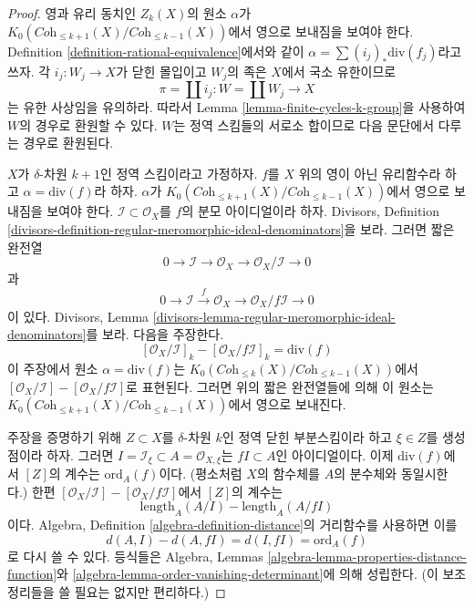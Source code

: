 \begin{proof}
영과 유리 동치인 $Z_k(X)$의 원소 $\alpha$가
$K_0(\textit{Coh}_{\leq k + 1}(X)/\textit{Coh}_{\leq k - 1}(X))$에서
영으로 보내짐을 보여야 한다. Definition
\ref{definition-rational-equivalence}에서와 같이
$\alpha = \sum (i_j)_*\text{div}(f_j)$라고 쓰자. 각
$i_j : W_j \to X$가 닫힌 몰입이고 $W_j$의 족은 $X$에서 국소 유한이므로
$$
\pi = \coprod i_j : W = \coprod W_j \longrightarrow X
$$
는 유한 사상임을 유의하라. 따라서 Lemma
\ref{lemma-finite-cycles-k-group}을 사용하여 $W$의 경우로 환원할 수 있다.
$W$는 정역 스킴들의 서로소 합이므로 다음 문단에서 다루는 경우로
환원된다.

\medskip\noindent
$X$가 $\delta$-차원 $k + 1$인 정역 스킴이라고 가정하자. $f$를 $X$ 위의
영이 아닌 유리함수라 하고 $\alpha = \text{div}(f)$라 하자.
$\alpha$가
$K_0(\textit{Coh}_{\leq k + 1}(X)/\textit{Coh}_{\leq k - 1}(X))$에서
영으로 보내짐을 보여야 한다. $\mathcal{I} \subset \mathcal{O}_X$를
$f$의 분모 아이디얼이라 하자. Divisors, Definition
\ref{divisors-definition-regular-meromorphic-ideal-denominators}을 보라.
그러면 짧은 완전열
$$
0 \to \mathcal{I} \to \mathcal{O}_X \to \mathcal{O}_X/\mathcal{I} \to 0
$$
과
$$
0 \to \mathcal{I} \xrightarrow{f} \mathcal{O}_X \to
\mathcal{O}_X/f\mathcal{I} \to 0
$$
이 있다. Divisors, Lemma
\ref{divisors-lemma-regular-meromorphic-ideal-denominators}를 보라.
다음을 주장한다.
$$
[\mathcal{O}_X/\mathcal{I}]_k - [\mathcal{O}_X/f\mathcal{I}]_k =
\text{div}(f)
$$
이 주장에서 원소 $\alpha = \text{div}(f)$는
$K_0(\textit{Coh}_{\leq k}(X)/\textit{Coh}_{\leq k - 1}(X))$에서
$[\mathcal{O}_X/\mathcal{I}] - [\mathcal{O}_X/f\mathcal{I}]$로 표현된다.
그러면 위의 짧은 완전열들에 의해 이 원소는
$K_0(\textit{Coh}_{\leq k + 1}(X)/\textit{Coh}_{\leq k - 1}(X))$에서
영으로 보내진다.

\medskip\noindent
주장을 증명하기 위해 $Z \subset X$를 $\delta$-차원 $k$인 정역 닫힌
부분스킴이라 하고 $\xi \in Z$를 생성점이라 하자. 그러면
$I = \mathcal{I}_\xi \subset A = \mathcal{O}_{X, \xi}$는
$fI \subset A$인 아이디얼이다. 이제 $\text{div}(f)$에서 $[Z]$의 계수는
$\text{ord}_A(f)$이다. (평소처럼 $X$의 함수체를 $A$의 분수체와
동일시한다.) 한편
$[\mathcal{O}_X/\mathcal{I}] - [\mathcal{O}_X/f\mathcal{I}]$에서 $[Z]$의
계수는
$$
\text{length}_A(A/I) - \text{length}_A(A/fI)
$$
이다. Algebra, Definition \ref{algebra-definition-distance}의 거리함수를
사용하면 이를
$$
d(A, I) - d(A, fI) = d(I, fI) = \text{ord}_A(f)
$$
로 다시 쓸 수 있다. 등식들은 Algebra, Lemmas
\ref{algebra-lemma-properties-distance-function}와
\ref{algebra-lemma-order-vanishing-determinant}에 의해 성립한다.
(이 보조정리들을 쓸 필요는 없지만 편리하다.)
\end{proof}

